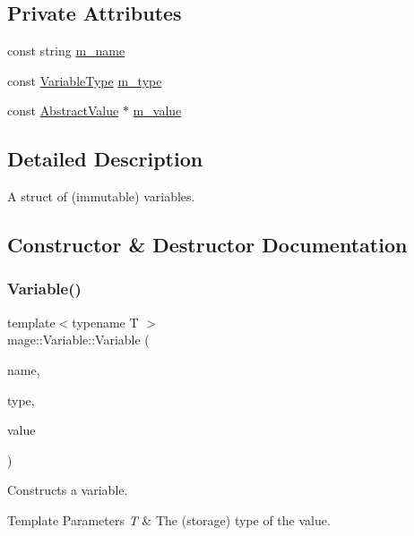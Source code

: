 \subsection*{Private Attributes}
\begin{DoxyCompactItemize}
\item 
const string \hyperlink{structmage_1_1_variable_afac262aa51bb1dfe447d501abcaa08d0}{m\+\_\+name}
\item 
const \hyperlink{namespacemage_a530428e73bac0ba7fe84b29086a9e33a}{Variable\+Type} \hyperlink{structmage_1_1_variable_acb45a61a0690e0efac614915595c4449}{m\+\_\+type}
\item 
const \hyperlink{structmage_1_1_variable_1_1_abstract_value}{Abstract\+Value} $\ast$ \hyperlink{structmage_1_1_variable_a99388f3fbccf983b8d6954fd31d0eb27}{m\+\_\+value}
\end{DoxyCompactItemize}


\subsection{Detailed Description}
A struct of (immutable) variables. 

\subsection{Constructor \& Destructor Documentation}
\hypertarget{structmage_1_1_variable_a86a59487f5ae51954f75a27b6c9487ce}{}\label{structmage_1_1_variable_a86a59487f5ae51954f75a27b6c9487ce} 
\subsubsection{\texorpdfstring{Variable()}{Variable()}}
{\footnotesize\ttfamily template$<$typename T $>$ \\
mage\+::\+Variable\+::\+Variable (\begin{DoxyParamCaption}\item[{const string \&}]{name,  }\item[{\hyperlink{namespacemage_a530428e73bac0ba7fe84b29086a9e33a}{Variable\+Type}}]{type,  }\item[{const T $\ast$}]{value }\end{DoxyParamCaption})}

Constructs a variable.


\begin{DoxyTemplParams}{Template Parameters}
{\em T} & The (storage) type of the value. \\
\hline
\end{DoxyTemplParams}

